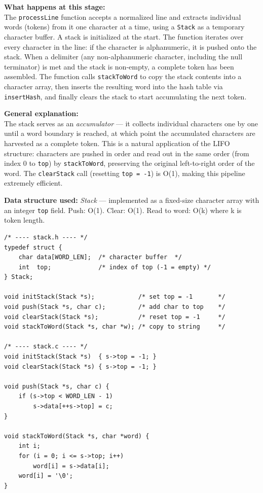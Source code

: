 \documentclass[12pt,a4paper]{article}
\begin{document}
\textbf{What happens at this stage:}\\
The \texttt{processLine} function accepts a normalized line and extracts individual words (tokens) from it one character at a time, using a \texttt{Stack} as a temporary character buffer. A stack is initialized at the start. The function iterates over every character in the line: if the character is alphanumeric, it is pushed onto the stack. When a delimiter (any non-alphanumeric character, including the null terminator) is met and the stack is non-empty, a complete token has been assembled. The function calls \texttt{stackToWord} to copy the stack contents into a character array, then inserts the resulting word into the hash table via \texttt{insertHash}, and finally clears the stack to start accumulating the next token.

\smallskip
\textbf{General explanation:}\\
The stack serves as an \textit{accumulator} — it collects individual characters one by one until a word boundary is reached, at which point the accumulated characters are harvested as a complete token. This is a natural application of the LIFO structure: characters are pushed in order and read out in the same order (from index 0 to \texttt{top}) by \texttt{stackToWord}, preserving the original left-to-right order of the word. The \texttt{clearStack} call (resetting \texttt{top = -1}) is O(1), making this pipeline extremely efficient.

\smallskip
\textbf{Data structure used:} \textit{Stack} — implemented as a fixed-size character array with an integer \texttt{top} field. Push: O(1). Clear: O(1). Read to word: O(k) where k is token length.

\begin{lstlisting}[caption={\texttt{stack.h} + \texttt{stack.c} -- Stack definition and operations}]
/* ---- stack.h ---- */
typedef struct {
    char data[WORD_LEN];  /* character buffer  */
    int  top;             /* index of top (-1 = empty) */
} Stack;

void initStack(Stack *s);            /* set top = -1       */
void push(Stack *s, char c);         /* add char to top    */
void clearStack(Stack *s);           /* reset top = -1     */
void stackToWord(Stack *s, char *w); /* copy to string     */

/* ---- stack.c ---- */
void initStack(Stack *s)  { s->top = -1; }
void clearStack(Stack *s) { s->top = -1; }

void push(Stack *s, char c) {
    if (s->top < WORD_LEN - 1)
        s->data[++s->top] = c;
}

void stackToWord(Stack *s, char *word) {
    int i;
    for (i = 0; i <= s->top; i++)
        word[i] = s->data[i];
    word[i] = '\0';
}
\end{lstlisting}
\end{document}
